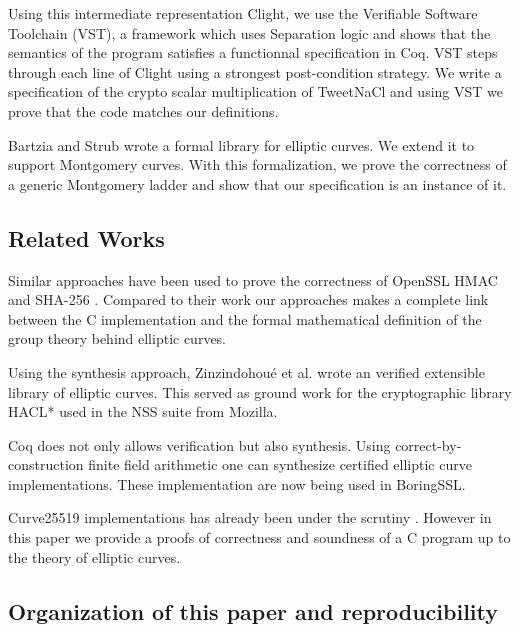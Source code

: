 Using this intermediate representation Clight, we use the Verifiable Software Toolchain
(VST)\cite{2012-Appel}, a framework which uses Separation logic\cite{1969-Hoare,Reynolds02separationlogic}
and shows that the semantics of the program satisfies a functionnal specification in Coq.
VST steps through each line of Clight using a strongest post-condition strategy.
We write a specification of the crypto scalar multiplication of TweetNaCl and using
VST we prove that the code matches our definitions.

Bartzia and Strub wrote a formal library for elliptic curves\cite{DBLP:conf/itp/BartziaS14}.
We extend it to support Montgomery curves. With this formalization, we prove the
correctness of a generic Montgomery ladder and show that our specification is an instance of it.

\subsection{Related Works}

Similar approaches have been used to prove the correctness of OpenSSL HMAC
\cite{Beringer2015VerifiedCA} and SHA-256 \cite{2015-Appel}. Compared to their work
our approaches makes a complete link between the C implementation and the formal
mathematical definition of the group theory behind elliptic curves.

Using the synthesis approach, Zinzindohou{\'{e}} et al. wrote an verified extensible
library of elliptic curves\cite{Zinzindohoue2016AVE}. This served as ground work for the
cryptographic library HACL*\cite{zinzindohoue2017hacl} used in the NSS suite from Mozilla.

Coq does not only allows verification but also synthesis.
Using correct-by-construction finite field arithmetic\cite{Philipoom2018CorrectbyconstructionFF}
one can synthesize\cite{Erbsen2016SystematicSO} certified elliptic curve
implementations\cite{Erbsen2017CraftingCE}. These implementation are now being used in BoringSSL\cite{fiat-crypto}.

Curve25519 implementations has already been under the scrutiny \cite{Chen2014VerifyingCS}.
However in this paper we provide a proofs of correctness and soundness of a C program up to
the theory of elliptic curves.

\subsection{Organization of this paper and reproducibility}

